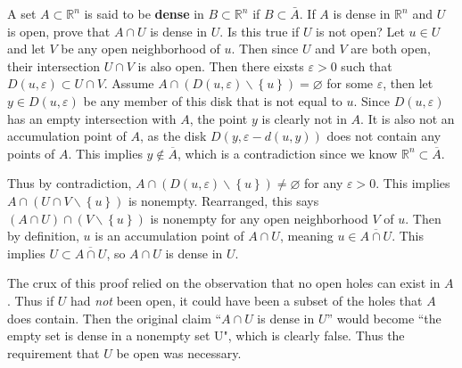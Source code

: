 \documentclass[10pt]{amsart}
\theoremstyle{plain}
\newenvironment{exercise}[1]{%
  \renewcommand\themanualtheoreminner{#1}%
  \manualtheoreminner
}{\endmanualtheoreminner}
\theoremstyle{definition}
\begin{document}
\begin{exercise}{2.44}
	A set $A \subset \mathbb{R}^n$ is said to be \textbf{dense} in $B \subset \mathbb{R}^n$ if $B \subset \bar{A} $. If $A$ is dense in $\mathbb{R}^n$ and $U$ is open, prove that $A \cap U$ is dense in $U$. Is this true if $U$ is not open?
	\hrulefill
\end{exercise}
Let $u \in U$ and let $V$ be any open neighborhood of $u$. Then since $U$ and $V$ are both open, their intersection $U \cap V$ is also open. Then there eixsts $\varepsilon>0$ such that $D(u,\varepsilon) \subset U \cap V$. Assume $A \cap (D(u,\varepsilon) \backslash \left\{ u \right\}) = \varnothing$ for some $\varepsilon$, then let $y \in D(u,\varepsilon)$ be any member of this disk that is not equal to $u$. Since $D(u,\varepsilon)$ has an empty intersection with $A$, the point $y$ is clearly not in $A$. It is also not an accumulation point of $A$, as the disk $D(y,  \varepsilon-d(u,y))$ does not contain any points of $A$. This implies $y \not\in \overline{A}$, which is a contradiction since we know $\mathbb{R}^n \subset \overline{A}$.

Thus by contradiction, $A \cap (D(u,\varepsilon) \backslash \left\{ u \right\}) \neq \varnothing$ for any $\varepsilon>0$. This implies $A \cap (U \cap V \backslash \left\{ u \right\})$ is nonempty. Rearranged, this says $(A \cap U) \cap (V \backslash \left\{ u \right\})$ is nonempty for any open neighborhood $V$ of $u$. Then by definition, $u$ is an accumulation point of $A \cap U$, meaning $u \in \overline{A \cap U}$. This implies $U \subset \overline{A \cap U}$, so $A \cap U$ is dense in $U$.

The crux of this proof relied on the observation that no open holes can exist in $A$. Thus if $U$ had \textit{not} been open, it could have been a subset of the holes that $A$ does contain. Then the original claim ``$A \cap U$ is dense in $U$'' would become ``the empty set is dense in a nonempty set U", which is clearly false. Thus the requirement that $U$ be open was necessary.
\end{document}
